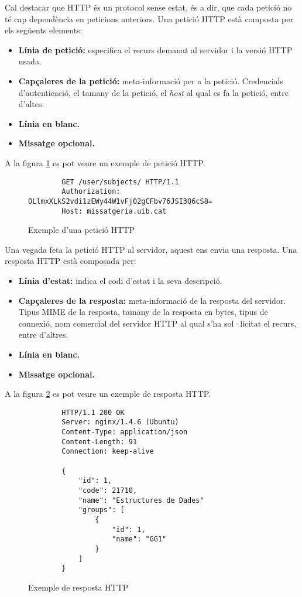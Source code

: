 Cal destacar que \ac{HTTP} és un protocol sense estat, és a dir, que cada petició no té cap dependència en peticions anteriors. Una petició \ac{HTTP} està composta per els següents elements:
\begin{itemize}
	\item \textbf{Línia de petició:} especifica el recurs demanat al servidor i la versió \ac{HTTP} usada.
	\item \textbf{Capçaleres de la petició:} meta-informació per a la petició. Credencials d'autenticació, el tamany de la petició, el \emph{host} al qual es fa la petició, entre d'altes.
	\item \textbf{Línia en blanc.}
	\item \textbf{Missatge opcional.}
\end{itemize}
 
A la figura \ref{fig:exemple_peticio_http} es pot veure un exemple de petició \ac{HTTP}.

\begin{figure}[h!]
	\begin{verbatim}
		GET /user/subjects/ HTTP/1.1
		Authorization: OLlmxXLkS2vdi1zEWy44W1vFj02gCFbv76JSI3Q6cS8=
		Host: missatgeria.uib.cat
	\end{verbatim}
\caption{Exemple d'una petició \ac{HTTP}}
\label{fig:exemple_peticio_http}
\end{figure}

Una vegada feta la petició \ac{HTTP} al servidor, aquest ens envia una resposta. Una resposta \ac{HTTP} està composada per:

\begin{itemize}
	\item \textbf{Línia d'estat:} indica el codi d'estat i la seva descripció.
	\item \textbf{Capçaleres de la resposta:} meta-informació de la resposta del servidor. Tipus \ac{MIME} de la resposta, tamany de la resposta en bytes, tipus de connexió, nom comercial del servidor \ac{HTTP} al qual s'ha sol·licitat el recurs, entre d'altres.
	\item \textbf{Línia en blanc.}
	\item \textbf{Missatge opcional.}
\end{itemize}

A la figura \ref{fig:exemple_resposta_http} es pot veure un exemple de resposta \ac{HTTP}.\\

\begin{figure}[h!]
	\begin{verbatim}
		HTTP/1.1 200 OK
		Server: nginx/1.4.6 (Ubuntu)
		Content-Type: application/json
		Content-Length: 91
		Connection: keep-alive
		
  		{
   			"id": 1,
   			"code": 21710,
   			"name": "Estructures de Dades"
    		"groups": [
      			{
        			"id": 1,
        			"name": "GG1"
     			}
    		]
   		}
  	\end{verbatim}
  	\caption{Exemple de resposta \ac{HTTP}}
  	\label{fig:exemple_resposta_http}
 \end{figure}
 
